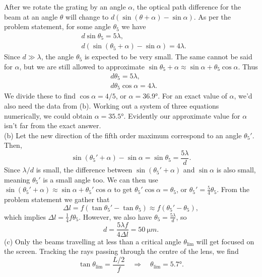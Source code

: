 \documentclass[../TST.tex]{subfiles}
\begin{document}
\begin{solution}
\begin{figure}[H]
\begin{minipage}[b]{0.5\textwidth}
	\end{minipage}
\end{figure}
	After we rotate the grating by an angle $\alpha$, the optical path difference for the beam at an angle $\theta$ will change to $d(\sin{(\theta+\alpha)}-\sin{\alpha})$. As per the problem statement, for some angle $\theta_5$ we have
\begin{align*}
	&d\sin{\theta_5}=5\lambda,\\
	&d(\sin{(\theta_5+\alpha)}-\sin{\alpha})=4\lambda.
\end{align*}
Since $d\gg\lambda$, the angle $\theta_5$ is expected to be very small. The same cannot be said for $\alpha$, but we are still allowed to approximate $\sin{\theta_5+\alpha}\approx \sin{\alpha}+\theta_5\cos{\alpha}$. Thus
\begin{align*}
	&d{\theta_5}=5\lambda,\\
	&d\theta_5\cos{\alpha}=4\lambda.
\end{align*}
We divide these to find $\cos{\alpha}=4/5$, or $\boxed{\alpha=\ang{36.9}}$. For an exact value of $\alpha$, we'd also need the data from (b). Working out a system of three equations numerically, we could obtain $\alpha=\ang{35.5}$. Evidently our approximate value for $\alpha$ isn't far from the exact answer. \\

(b) Let the new direction of the fifth order maximum correspond to an angle $\theta_5'$. Then,
\begin{equation*}
	\sin{(\theta_5'+\alpha)}-\sin{\alpha}=\sin{\theta_5}=\frac{5\lambda}{d}.
\end{equation*}
Since $\lambda/d$ is small, the difference between $\sin{(\theta_5'+\alpha)}$ and $\sin{\alpha}$ is also small, meaning $\theta_5'$ is a small angle too. We can then use $\sin{(\theta_5'+\alpha)}\approx\sin{\alpha}+\theta_5'\cos{\alpha}$ to get $\theta_5'\cos{\alpha}=\theta_5$, or $\theta_5'=\frac{5}{4}\theta_5$. From the problem statement we gather that
\begin{equation*}
\Delta l = f(\tan\theta_5'-\tan\theta_5) \approx f(\theta_5'-\theta_5)
,
\end{equation*}
which implies $\Delta l=\frac{1}{4}f\theta_5$. However, we also have $\theta_5=\frac{5\lambda}{d}$, so
\begin{equation*}
	\boxed{d=\frac{5\lambda f}{4\Delta l}=\qty{50}{\micro m}.}
\end{equation*}
(c) Only the beams travelling at less than a critical angle $\theta_\mathrm{lim}$ will get focused on the screen. Tracking the rays passing through the centre of the lens, we find
\begin{equation*}
	\tan{\theta_\mathrm{lim}}=\frac{L/2}{f} \quad\Rightarrow\quad \theta_\mathrm{lim}=\ang{5.7}
.
\end{equation*}


\end{solution}
\end{document}
